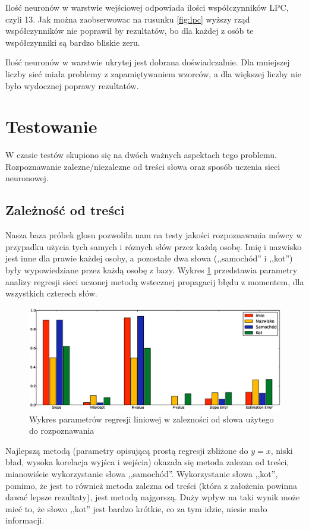 \documentclass[a4paper]{article}
\begin{document}
Ilość neuronów w warstwie wejściowej odpowiada ilości współczynników LPC, czyli
13. Jak można zaobserwowac na rusunku \ref{fig:lpc} wyższy rząd współczynników
nie poprawił by rezultatów, bo dla każdej z osób te współczynniki są bardzo
bliskie zeru.

Ilość neuronów w warstwie ukrytej jest dobrana doświadczalnie. Dla mniejszej
liczby sieć miała problemy z zapamiętywaniem wzorców, a dla większej liczby nie
było wydocznej poprawy rezultatów.

\section{Testowanie}

W czasie testów skupiono się na dwóch ważnych aspektach tego problemu.
Rozpoznawanie zalezne/niezalezne od treści słowa oraz sposób uczenia sieci
neuronowej.

\subsection{Zależność od treści}

Nasza baza próbek glosu pozwoliła nam na testy jakości rozpoznawania mówcy w
przypadku użycia tych samych i róznych słów przez każdą osobę. Imię i nazwisko
jest inne dla prawie każdej osoby, a pozostałe dwa słowa (,,samochód'' i
,,kot'') były wypowiedziane przez każdą osobę z bazy. Wykres \ref{fig:word}
przedstawia parametry analizy regresji sieci uczonej metodą wstecznej
propagacij błędu z momentem, dla wszystkich czterech słów.

\begin{figure}[h!]
    \includegraphics[width=\textwidth]{word_network_reggresion}
    \caption{Wykres parametrów regresji liniowej w zalezności od słowa użytego
    do rozpoznawania}
    \label{fig:word}
\end{figure}

Najlepszą metodą (parametry opisującą prostą regresji zbliżone do $y=x$, niski
bład, wysoka korelacja wyjśca i wejścia) okazała się metoda zalezna od treści,
mianowiście wykorzystanie słowa ,,samochód''. Wykorzystanie słowa ,,kot'',
pomimo, że jest to również metoda zalezna od treści (która z założenia powinna
dawać lepsze rezultaty), jest metodą najgorszą. Duży wpływ na taki wynik może
mieć to, że słowo ,,kot'' jest bardzo krótkie, co za tym idzie, niesie mało
informacji.
\end{document}
